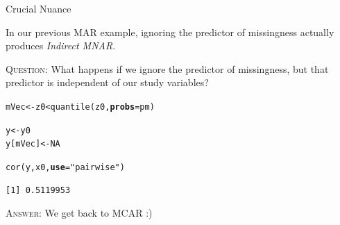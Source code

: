 \documentclass{beamer}\usepackage[]{graphicx}\usepackage[]{color}
\makeatletter
\newcommand{\hlnum}[1]{\textcolor[rgb]{0.69,0.494,0}{#1}}%
\newcommand{\hlstr}[1]{\textcolor[rgb]{0.749,0.012,0.012}{#1}}%
\newcommand{\hlopt}[1]{\textcolor[rgb]{0,0,0}{#1}}%
\newcommand{\hlstd}[1]{\textcolor[rgb]{0,0,0}{#1}}%
\newcommand{\hlkwb}[1]{\textcolor[rgb]{0,0.341,0.682}{#1}}%
\newcommand{\hlkwc}[1]{\textcolor[rgb]{0,0,0}{\textbf{#1}}}%
\newcommand{\hlkwd}[1]{\textcolor[rgb]{0.004,0.004,0.506}{#1}}%
\newenvironment{kframe}{%
 \def\at@end@of@kframe{}%
 \ifinner\ifhmode%
  \def\at@end@of@kframe{\end{minipage}}%
  \begin{minipage}{\columnwidth}%
 \fi\fi%
 \def\FrameCommand##1{\hskip\@totalleftmargin \hskip-\fboxsep
 \colorbox{shadecolor}{##1}\hskip-\fboxsep
     \hskip-\linewidth \hskip-\@totalleftmargin \hskip\columnwidth}%
 \MakeFramed {\advance\hsize-\width
   \@totalleftmargin\z@ \linewidth\hsize
   \@setminipage}}%
 {\par\unskip\endMakeFramed%
 \at@end@of@kframe}
\newenvironment{knitrout}{}{} %
\newcommand{\rmsc}[1]{\textrm{\textsc{#1}}}
\makeatother
\begin{document}

\begin{frame}[fragile]{Crucial Nuance}
  
  In our previous MAR example, ignoring the predictor of missingness actually 
  produces \emph{Indirect MNAR}.\\
  
  \pause
  \va
  
  \rmsc{Question:} What happens if we ignore the predictor of missingness, but
  that predictor is independent of our study variables?
  
  \pause
  
\begin{knitrout}\footnotesize
{}\color{fgcolor}\begin{kframe}
\begin{alltt}
\hlstd{mVec} \hlkwb{<-} \hlstd{z0} \hlopt{<} \hlkwd{quantile}\hlstd{(z0,} \hlkwc{probs} \hlstd{= pm)}

\hlstd{y}       \hlkwb{<-} \hlstd{y0}
\hlstd{y[mVec]} \hlkwb{<-} \hlnum{NA}

\hlkwd{cor}\hlstd{(y, x0,} \hlkwc{use} \hlstd{=} \hlstr{"pairwise"}\hlstd{)}
\end{alltt}
\begin{verbatim}
[1] 0.5119953
\end{verbatim}
\end{kframe}
\end{knitrout}

\rmsc{Answer:} We get back to MCAR :)

\end{frame}

\end{document}
